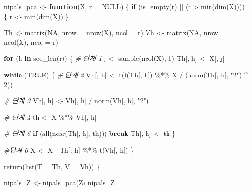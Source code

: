 \documentclass[
]{book}
\newenvironment{Shaded}{\begin{snugshade}}{\end{snugshade}}
\newcommand{\AttributeTok}[1]{\textcolor[rgb]{0.77,0.63,0.00}{#1}}
\newcommand{\CommentTok}[1]{\textcolor[rgb]{0.56,0.35,0.01}{\textit{#1}}}
\newcommand{\ConstantTok}[1]{\textcolor[rgb]{0.00,0.00,0.00}{#1}}
\newcommand{\ControlFlowTok}[1]{\textcolor[rgb]{0.13,0.29,0.53}{\textbf{#1}}}
\newcommand{\DecValTok}[1]{\textcolor[rgb]{0.00,0.00,0.81}{#1}}
\newcommand{\FunctionTok}[1]{\textcolor[rgb]{0.00,0.00,0.00}{#1}}
\newcommand{\NormalTok}[1]{#1}
\newcommand{\OtherTok}[1]{\textcolor[rgb]{0.56,0.35,0.01}{#1}}
\newcommand{\SpecialCharTok}[1]{\textcolor[rgb]{0.00,0.00,0.00}{#1}}
\newcommand{\StringTok}[1]{\textcolor[rgb]{0.31,0.60,0.02}{#1}}
\begin{document}
\begin{Shaded}
\begin{Highlighting}[]
\NormalTok{nipals\_pca }\OtherTok{\textless{}{-}} \ControlFlowTok{function}\NormalTok{(X, }\AttributeTok{r =} \ConstantTok{NULL}\NormalTok{) \{}
  \ControlFlowTok{if}\NormalTok{ (}\FunctionTok{is\_empty}\NormalTok{(r) }\SpecialCharTok{||}\NormalTok{ (r }\SpecialCharTok{\textgreater{}} \FunctionTok{min}\NormalTok{(}\FunctionTok{dim}\NormalTok{(X)))) \{}
\NormalTok{    r }\OtherTok{\textless{}{-}} \FunctionTok{min}\NormalTok{(}\FunctionTok{dim}\NormalTok{(X))}
\NormalTok{  \}}
  
\NormalTok{  Th }\OtherTok{\textless{}{-}} \FunctionTok{matrix}\NormalTok{(}\ConstantTok{NA}\NormalTok{, }\AttributeTok{nrow =} \FunctionTok{nrow}\NormalTok{(X), }\AttributeTok{ncol =}\NormalTok{ r)}
\NormalTok{  Vh }\OtherTok{\textless{}{-}} \FunctionTok{matrix}\NormalTok{(}\ConstantTok{NA}\NormalTok{, }\AttributeTok{nrow =} \FunctionTok{ncol}\NormalTok{(X), }\AttributeTok{ncol =}\NormalTok{ r)}
  
  \ControlFlowTok{for}\NormalTok{ (h }\ControlFlowTok{in} \FunctionTok{seq\_len}\NormalTok{(r)) \{}
    \CommentTok{\# 단계 1}
\NormalTok{    j }\OtherTok{\textless{}{-}} \FunctionTok{sample}\NormalTok{(}\FunctionTok{ncol}\NormalTok{(X), }\DecValTok{1}\NormalTok{)}
\NormalTok{    Th[, h] }\OtherTok{\textless{}{-}}\NormalTok{ X[, j]}
    
    \ControlFlowTok{while}\NormalTok{ (}\ConstantTok{TRUE}\NormalTok{) \{}
      \CommentTok{\# 단계 2}
\NormalTok{      Vh[, h] }\OtherTok{\textless{}{-}} \FunctionTok{t}\NormalTok{(}\FunctionTok{t}\NormalTok{(Th[, h]) }\SpecialCharTok{\%*\%}\NormalTok{ X }\SpecialCharTok{/}\NormalTok{ (}\FunctionTok{norm}\NormalTok{(Th[, h], }\StringTok{"2"}\NormalTok{) }\SpecialCharTok{\^{}} \DecValTok{2}\NormalTok{))}
      
      \CommentTok{\# 단계 3}
\NormalTok{      Vh[, h] }\OtherTok{\textless{}{-}}\NormalTok{ Vh[, h] }\SpecialCharTok{/} \FunctionTok{norm}\NormalTok{(Vh[, h], }\StringTok{"2"}\NormalTok{)}
      
      \CommentTok{\# 단계 4}
\NormalTok{      th }\OtherTok{\textless{}{-}}\NormalTok{ X }\SpecialCharTok{\%*\%}\NormalTok{ Vh[, h]}
      
      \CommentTok{\# 단계 5}
      \ControlFlowTok{if}\NormalTok{ (}\FunctionTok{all}\NormalTok{(}\FunctionTok{near}\NormalTok{(Th[, h], th))) }\ControlFlowTok{break}
\NormalTok{      Th[, h] }\OtherTok{\textless{}{-}}\NormalTok{ th}
\NormalTok{    \}}
    
    \CommentTok{\#단계 6}
\NormalTok{    X }\OtherTok{\textless{}{-}}\NormalTok{ X }\SpecialCharTok{{-}}\NormalTok{ Th[, h] }\SpecialCharTok{\%*\%} \FunctionTok{t}\NormalTok{(Vh[, h])}
\NormalTok{  \}}
  
  \FunctionTok{return}\NormalTok{(}\FunctionTok{list}\NormalTok{(}\AttributeTok{T =}\NormalTok{ Th, }\AttributeTok{V =}\NormalTok{ Vh))}
\NormalTok{\}}

\NormalTok{nipals\_Z }\OtherTok{\textless{}{-}} \FunctionTok{nipals\_pca}\NormalTok{(Z)}
\NormalTok{nipals\_Z}
\end{Highlighting}
\end{Shaded}
\end{document}

